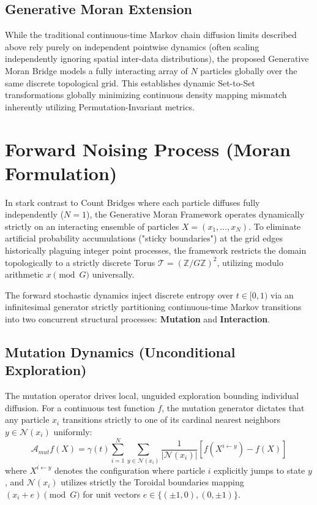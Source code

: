 \documentclass{article}
\begin{document}
\subsection{Generative Moran Extension}
While the traditional continuous-time Markov chain diffusion limits described above rely purely on independent pointwise dynamics (often scaling independently ignoring spatial inter-data distributions), the proposed Generative Moran Bridge models a fully interacting array of \(N\) particles globally over the same discrete topological grid. This establishes dynamic Set-to-Set transformations globally minimizing continuous density mapping mismatch inherently utilizing Permutation-Invariant metrics.

\section{Forward Noising Process (Moran Formulation)}
In stark contrast to Count Bridges where each particle diffuses fully independently (\(N=1\)), the Generative Moran Framework operates dynamically strictly on an interacting ensemble of particles \(X = (x_1, \dots, x_N)\). To eliminate artificial probability accumulations ("sticky boundaries") at the grid edges historically plaguing integer point processes, the framework restricts the domain topologically to a strictly discrete Torus \(\mathcal{T} = (\mathbb{Z}/G\mathbb{Z})^2\), utilizing modulo arithmetic \(x \pmod G\) universally. 

The forward stochastic dynamics inject discrete entropy over \(t \in [0, 1)\) via an infinitesimal generator strictly partitioning continuous-time Markov transitions into two concurrent structural processes: \textbf{Mutation} and \textbf{Interaction}.

\subsection{Mutation Dynamics (Unconditional Exploration)}
The mutation operator drives local, unguided exploration bounding individual diffusion. For a continuous test function \(f\), the mutation generator dictates that any particle \(x_i\) transitions strictly to one of its cardinal nearest neighbors \(y \in \mathcal{N}(x_i)\) uniformly:
\[
\mathcal{A}_{mut} f(X) = \gamma(t) \sum_{i=1}^N \sum_{y \in \mathcal{N}(x_i)} \frac{1}{|\mathcal{N}(x_i)|} \left[ f(X^{i \leftarrow y}) - f(X) \right]
\]
where \(X^{i \leftarrow y}\) denotes the configuration where particle \(i\) explicitly jumps to state \(y\), and \(\mathcal{N}(x_i)\) utilizes strictly the Toroidal boundaries mapping \((x_i + e) \pmod G\) for unit vectors \(e \in \{(\pm 1, 0), (0, \pm 1)\}\).
\end{document}
